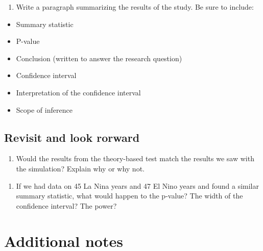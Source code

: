 \documentclass[
]{report}
\providecommand{\tightlist}{%
  \setlength{\itemsep}{0pt}\setlength{\parskip}{0pt}}
\begin{document}
\begin{enumerate}
\def\labelenumi{\arabic{enumi}.}
\setcounter{enumi}{18}
\tightlist
\item
  Write a paragraph summarizing the results of the study. Be sure to include:
\end{enumerate}

\begin{itemize}
\item
  Summary statistic
\item
  P-value
\item
  Conclusion (written to answer the research question)
\item
  Confidence interval
\item
  Interpretation of the confidence interval
\item
  Scope of inference
\end{itemize}

\vspace{3in}

\hypertarget{revisit-and-look-rorward}{%
\subsection{Revisit and look rorward}\label{revisit-and-look-rorward}}

\begin{enumerate}
\def\labelenumi{\arabic{enumi}.}
\setcounter{enumi}{19}
\tightlist
\item
  Would the results from the theory-based test match the results we saw with the simulation? Explain why or why not.
\end{enumerate}

\vspace{1in}

\begin{enumerate}
\def\labelenumi{\arabic{enumi}.}
\setcounter{enumi}{20}
\tightlist
\item
  If we had data on 45 La Nina years and 47 El Nino years and found a similar summary statistic, what would happen to the p-value? The width of the confidence interval? The power?
\end{enumerate}

\vspace{1in}

\hypertarget{additional-notes}{%
\section{Additional notes}\label{additional-notes}}
\end{document}
